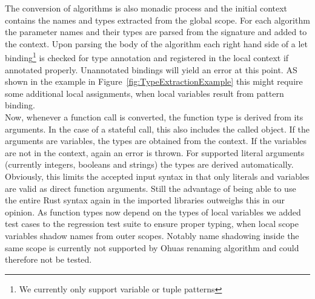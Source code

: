 The conversion of algorithms is also monadic process and the initial context contains the names and types extracted from the global scope. For each algorithm the parameter names and their types are parsed from the signature and added to the context. Upon parsing the body of the algorithm each right hand side of a let binding\footnote{We currently only support variable or tuple patterns} is checked for type annotation and registered in the local context if annotated properly. Unannotated bindings will yield an error at this point. AS shown in the example in Figure~\ref{fig:TypeExtractionExample} this might require some additional local assignments, when local variables result from pattern binding.\\

Now, whenever a function call is converted, the function type is derived from its arguments. In the case of a stateful call, this also includes the called object. If the arguments are variables, the types are obtained from the context. If the variables are not in the context, again an error is thrown. For supported literal arguments (currently integers, booleans and strings) the types are derived automatically. Obviously, this limits the accepted input syntax in that only literals and variables are valid as direct function arguments. Still the advantage of being able to use the entire Rust syntax again in the imported libraries outweighs this in our opinion. As function types now depend on the types of local variables we added test cases to the regression test suite to ensure proper typing, when local scope variables shadow names from outer scopes. Notably name shadowing inside the same scope is currently not supported by Ohuas renaming algorithm and could therefore not be tested.\\


